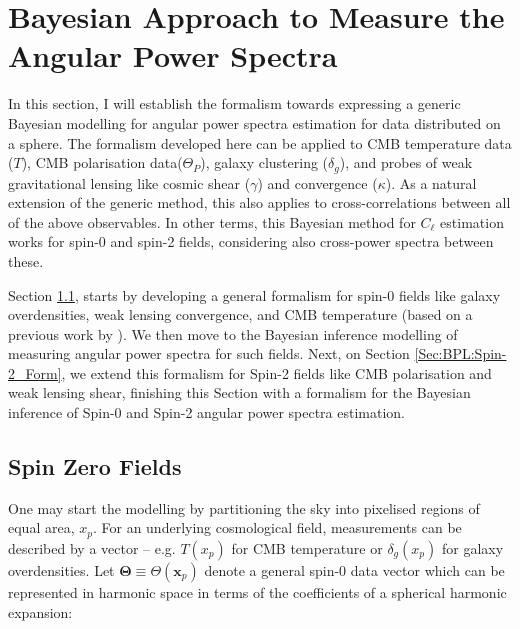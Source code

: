 
\section{Bayesian Approach to Measure the Angular Power Spectra}\label{Sec:BPL:Modeling}
In this section, I will establish the formalism towards expressing a generic Bayesian modelling for angular power spectra estimation for data distributed on a sphere. The formalism developed here can be applied to CMB temperature data ($T$), CMB polarisation data($\Theta_P$), galaxy clustering ($\delta_g$), and probes of weak gravitational lensing like cosmic shear ($\gamma$) and convergence ($\kappa$). As a natural extension of the generic method, this also applies to cross-correlations between all of the above observables. In other terms, this Bayesian method for $C_{\ell}$ estimation works for spin-0 and spin-2 fields, considering also cross-power spectra between these.

\qquad Section \ref{Sec:BPL:Spin-0_Form}, starts by developing a general formalism for spin-0 fields like galaxy overdensities, weak lensing convergence, and CMB temperature (based on a previous work by \cite{Taylor2008}). We then move to the Bayesian inference modelling of measuring angular power spectra for such fields. Next, on Section \ref{Sec:BPL:Spin-2_Form}, we extend this formalism for Spin-2 fields like CMB polarisation and weak lensing shear, finishing this Section with a formalism for the Bayesian inference of Spin-0 and Spin-2 angular power spectra estimation.


\subsection{Spin Zero Fields}\label{Sec:BPL:Spin-0_Form}
One may start the modelling by partitioning the sky into pixelised regions of equal area, $x_p$. For an underlying cosmological field, measurements can be described by a vector -- e.g. $T(x_p)$ for CMB temperature or $\delta_g (x_p)$ for galaxy overdensities. Let $\mathbf{\Theta} \equiv \Theta(\mathbf{x}_p)$ denote a general spin-0 data vector which can be represented in harmonic space in terms of the coefficients of a spherical harmonic expansion:

